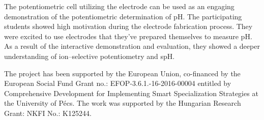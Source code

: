 \documentclass[manuscript=article, journal=jceda8]{achemso}
\begin{document}
The potentiometric cell utilizing the electrode can be used as an engaging demonstration of the potentiometric determination of pH. The participating students showed high motivation during the electrode fabrication process. They were excited to use electrodes that they've prepared themselves to measure pH. As a result of the interactive demonstration and evaluation, they showed a deeper understanding of ion--selective potentiometry and spH.




\begin{acknowledgement}
The project has been supported by the European Union, co-financed by the European Social Fund Grant no.: EFOP-3.6.1.-16-2016-00004 entitled by Comprehensive Development for Implementing Smart Specialization Strategies at the University of Pécs. The work was supported by the Hungarian Research Grant: NKFI No.: K125244.
\end{acknowledgement}


\end{document}
